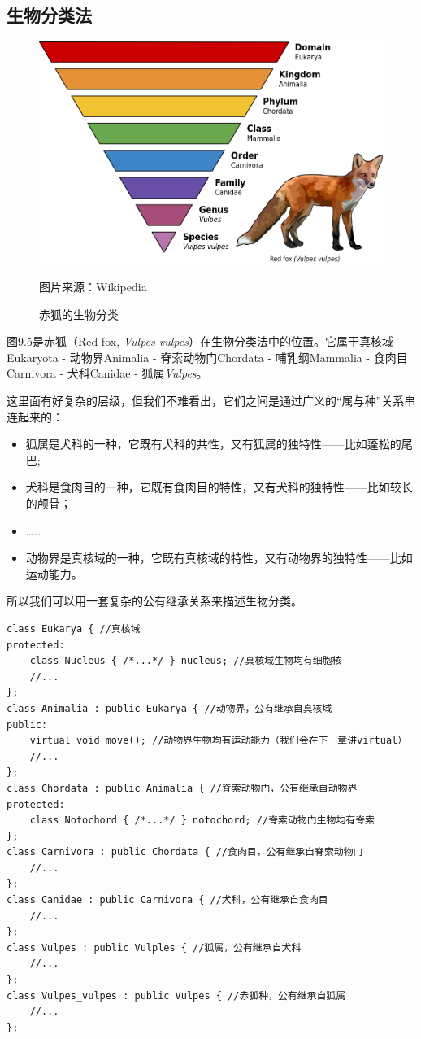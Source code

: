 \subsection*{生物分类法}
\begin{figure}[htbp]
    \centering
    \includegraphics[width=.65\textwidth]{../images/generalized_parts/09_taxonomic_rank_graph_of_red_fox.png}
    \caption{赤狐的生物分类}
    \footnotesize{图片来源：Wikipedia}
\end{figure}
图9.5是赤狐（Red fox, \textit{Vulpes vulpes}）在生物分类法中的位置。它属于真核域Eukaryota - 动物界Animalia - 脊索动物门Chordata - 哺乳纲Mammalia - 食肉目Carnivora - 犬科Canidae - 狐属\textit{Vulpes}。\par
这里面有好复杂的层级，但我们不难看出，它们之间是通过广义的``属与种''关系串连起来的：
\begin{itemize}
    \item 狐属是犬科的一种，它既有犬科的共性，又有狐属的独特性——比如蓬松的尾巴;
    \item 犬科是食肉目的一种，它既有食肉目的特性，又有犬科的独特性——比如较长的颅骨；
    \item ……
    \item 动物界是真核域的一种，它既有真核域的特性，又有动物界的独特性——比如运动能力。
\end{itemize}
所以我们可以用一套复杂的公有继承关系来描述生物分类。
\begin{lstlisting}
class Eukarya { //真核域
protected:
    class Nucleus { /*...*/ } nucleus; //真核域生物均有细胞核
    //...
};
class Animalia : public Eukarya { //动物界，公有继承自真核域
public:
    virtual void move(); //动物界生物均有运动能力（我们会在下一章讲virtual）
    //...
};
class Chordata : public Animalia { //脊索动物门，公有继承自动物界
protected:
    class Notochord { /*...*/ } notochord; //脊索动物门生物均有脊索
};
class Carnivora : public Chordata { //食肉目，公有继承自脊索动物门
    //...
};
class Canidae : public Carnivora { //犬科，公有继承自食肉目
    //...
};
class Vulpes : public Vulples { //狐属，公有继承自犬科
    //...
};
class Vulpes_vulpes : public Vulpes { //赤狐种，公有继承自狐属
    //...
};
\end{lstlisting}
